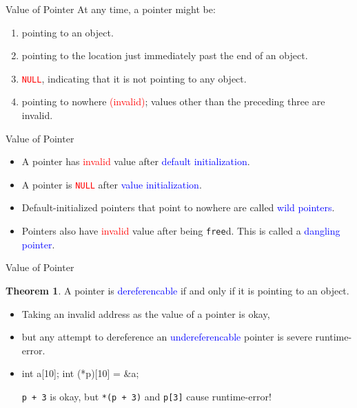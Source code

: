 \documentclass{beamer}
\newcommand{\red}[1]{\textcolor{red}{#1}}
\newcommand{\blue}[1]{\textcolor{blue}{#1}}
\newcommand{\ttt}[1]{\texttt{#1}}
\newcommand{\redtt}[1]{\red{\ttt{#1}}}
\theoremstyle{definition}
\newtheorem{thm}{Theorem}
\begin{document}
\begin{frame}{Value of Pointer}
    At any time, a pointer might be:
    \begin{enumerate}
        \item pointing to an object.
        \item pointing to the location just immediately past the end of an object.
        \item \redtt{NULL}, indicating that it is not pointing to any object.
        \item pointing to nowhere \red{(invalid)}; values other than the preceding three are invalid.
    \end{enumerate}
\end{frame}

\begin{frame}{Value of Pointer}
    \begin{itemize}
        \item A pointer has \red{invalid} value after \blue{default initialization}.
        \item A pointer is \redtt{NULL} after \blue{value initialization}.
        \pause
        \item Default-initialized pointers that point to nowhere are called \blue{wild pointers}.
        \item Pointers also have \red{invalid} value after being \ttt{free}d. This is called a \blue{dangling pointer}.
    \end{itemize}
\end{frame}

\begin{frame}[fragile]{Value of Pointer}
    \begin{thm}
        A pointer is \blue{dereferencable} if and only if it is pointing to an object.
    \end{thm}
    \begin{itemize}
        \item Taking an invalid address as the value of a pointer is okay,
        \item but any attempt to dereference an \blue{undereferencable} pointer is severe runtime-error.
        \pause
        \item \begin{cpp}
int a[10];
int (*p)[10] = &a;
        \end{cpp}
        \ttt{p + 3} is okay, but \ttt{*(p + 3)} and \ttt{p[3]} cause runtime-error!
    \end{itemize}
\end{frame}
\end{document}
